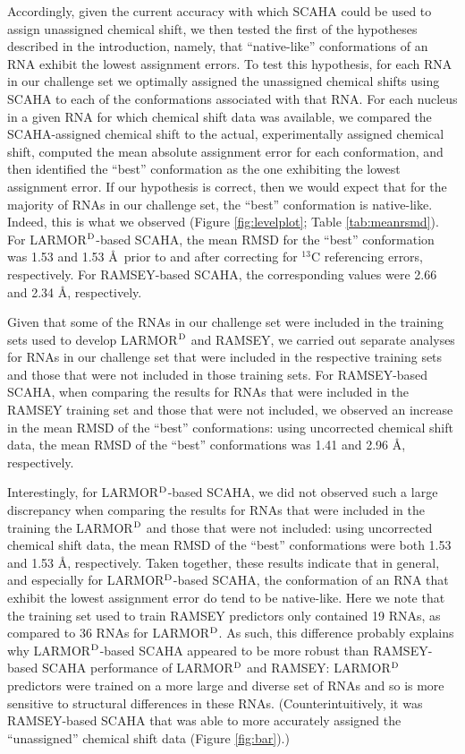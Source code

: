 \documentclass[journal=jcisd8,manuscript=article,layout=onecolumn]{achemso}
\begin{document}
Accordingly, given the current accuracy with which SCAHA could be used to assign unassigned chemical shift, we then tested the first of the hypotheses described in the introduction, namely, that “native-like” conformations of an RNA exhibit the lowest assignment errors. To test this hypothesis, for each RNA in our challenge set we optimally assigned the unassigned chemical shifts using SCAHA to each of the conformations associated with that RNA. For each nucleus in a given RNA for which chemical shift data was available, we compared the SCAHA-assigned chemical shift to the actual, experimentally assigned chemical shift, computed the mean absolute assignment error for each conformation, and then identified the ``best'' conformation as the one exhibiting the lowest assignment error. If our hypothesis is correct, then we would expect that for the majority of RNAs in our challenge set, the ``best'' conformation is native-like. Indeed, this is what we observed (Figure \ref{fig:levelplot}; Table \ref{tab:meanrsmd}). For LARMOR$^{\rm D}$-based SCAHA, the mean RMSD for the ``best'' conformation was 1.53 and 1.53 \AA\  prior to and after correcting for $^{13}$C referencing errors, respectively. For  RAMSEY-based SCAHA, the corresponding values were 2.66 and 2.34 \AA, respectively.

Given that some of the RNAs in our challenge set were included in the training sets used to develop LARMOR$^{\rm D}$ and RAMSEY, we carried out separate analyses for RNAs in our challenge set that were included in the respective training sets and those that were not included in those training sets. For RAMSEY-based SCAHA,  when comparing the results for RNAs that were included in the RAMSEY training set and those that were not included, we observed an increase in the mean RMSD of the ``best'' conformations: using uncorrected chemical shift data, the mean RMSD of the ``best'' conformations was 1.41 and 2.96 \AA, respectively. 

Interestingly, for LARMOR$^{\rm D}$-based SCAHA,  we did not observed such a large discrepancy when comparing the results for RNAs that were included in the training the LARMOR$^{\rm D}$ and those that were not included: using uncorrected chemical shift data, the mean RMSD of the ``best'' conformations were both 1.53 and 1.53 \AA, respectively. Taken together, these results indicate that in general, and especially for LARMOR$^{\rm D}$-based SCAHA, the conformation of an RNA that exhibit the lowest assignment error do tend to be native-like. Here we note that the training set used to train RAMSEY predictors only contained 19 RNAs, as compared to 36 RNAs for LARMOR$^{\rm D}$. As such, this difference probably explains why LARMOR$^{\rm D}$-based SCAHA appeared to be more robust than RAMSEY-based SCAHA performance of LARMOR$^{\rm D}$ and RAMSEY: LARMOR$^{\rm D}$ predictors were trained on a more large and diverse set of RNAs and so is more sensitive to structural differences in these RNAs. (Counterintuitively, it was RAMSEY-based SCAHA that was able to more accurately assigned the ``unassigned'' chemical shift data (Figure \ref{fig:bar}).)
\end{document}

